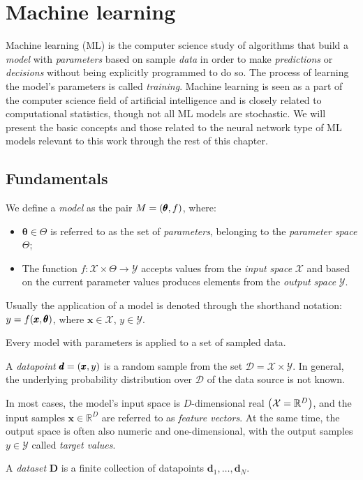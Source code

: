 \section{Machine learning}
Machine learning (ML) is the computer science study of algorithms that build a \emph{model} with \emph{parameters} based on sample \emph{data} in order to make \emph{predictions} or \emph{decisions} without being explicitly programmed to do so. The process of learning the model's parameters is called \emph{training}. Machine learning is seen as a part of the computer science field of artificial intelligence and is closely related to computational statistics, though not all ML models are stochastic. We will present the basic concepts and those related to the neural network type of ML models relevant to this work through the rest of this chapter. 

\subsection{Fundamentals}

\begin{definition}
We define a \emph{model} as the pair $M = \mathopen{}\left(\pmb{\theta}, f\right)$, where:
\begin{itemize}
\item $\pmb{\theta} \in \Theta$ is referred to as the set of \emph{parameters}, belonging to the \emph{parameter space} $\Theta$;
\item The function $f: \mathcal{X} \times \Theta \to \mathcal{Y}$ accepts values from the \emph{input space} $\mathcal{X}$ and based on the current parameter values produces elements from the \emph{output space} $\mathcal{Y}$.
\end{itemize}
Usually the application of a model is denoted through the shorthand notation:\\ $y = f\mathopen{}\left(\pmb{x}, \pmb{\theta}\right)$, where $\pmb{x} \in \mathcal{X}$, $y \in \mathcal{Y}$.
\end{definition}

Every model with parameters is applied to a set of sampled data.

\begin{definition}
A \emph{datapoint} $\pmb{d}=\mathopen{}\left(\pmb{x}, y\right)$ is a random sample from the set $\mathcal{D} = \mathcal{X} \times \mathcal{Y}$. In general, the underlying probability distribution over $\mathcal{D}$ of the data source is not known. 

In most cases, the model's input space is $D$-dimensional real $\mathopen{}\left(\mathcal{X}=\mathbb{R}^D\right)$, and the input samples $\pmb{x} \in \mathbb{R}^D$ are referred to as \emph{feature vectors}. At the same time, the output space is often also numeric and one-dimensional, with the output samples $y \in \mathcal{Y}$ called \emph{target values}.  

A \emph{dataset} $\pmb{D}$ is a finite collection of datapoints $\pmb{d}_1,\dots,\pmb{d}_N$.
\end{definition}

